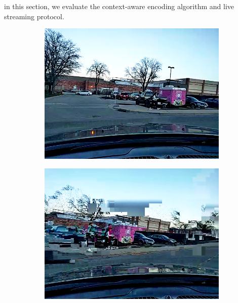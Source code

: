 


in this section, we evaluate the context-aware encoding algorithm
and live streaming protocol. 


\begin{figure}[ht]
  \centering
  \begin{subfigure}[t]{0.25\textwidth}
    \includegraphics[width=\linewidth]{Figs/RTDrive/evaluation/frames/default_0.png}
  \end{subfigure}%
  \begin{subfigure}[t]{0.25\textwidth}
    \includegraphics[width=\linewidth]{Figs/RTDrive/evaluation/frames/default_1.png}
  \end{subfigure}%
  \begin{subfigure}[t]{0.25\textwidth}

\end{subfigure}
\end{figure}

